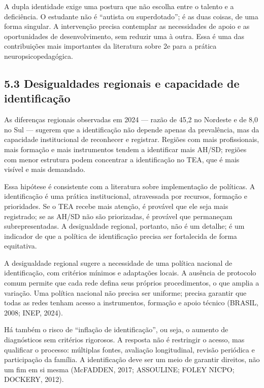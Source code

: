 A dupla identidade exige uma postura que não escolha entre o talento e a
deficiência. O estudante não é ``autista ou superdotado''; é as duas
coisas, de uma forma singular. A intervenção precisa contemplar as
necessidades de apoio e as oportunidades de desenvolvimento, sem reduzir
uma à outra. Essa é uma das contribuições mais importantes da literatura
sobre 2e para a prática neuropsicopedagógica.

\subsection{5.3 Desigualdades regionais e capacidade de
identificação}\label{desigualdades-regionais-e-capacidade-de-identificauxe7uxe3o}

As diferenças regionais observadas em 2024 --- razão de 45,2 no Nordeste
e de 8,0 no Sul --- sugerem que a identificação não depende apenas da
prevalência, mas da capacidade institucional de reconhecer e registrar.
Regiões com mais profissionais, mais formação e mais instrumentos tendem
a identificar mais AH/SD; regiões com menor estrutura podem concentrar a
identificação no TEA, que é mais visível e mais demandado.

Essa hipótese é consistente com a literatura sobre implementação de
políticas. A identificação é uma prática institucional, atravessada por
recursos, formação e prioridades. Se o TEA recebe mais atenção, é
provável que ele seja mais registrado; se as AH/SD não são priorizadas,
é provável que permaneçam subrepresentadas. A desigualdade regional,
portanto, não é um detalhe; é um indicador de que a política de
identificação precisa ser fortalecida de forma equitativa.

A desigualdade regional sugere a necessidade de uma política nacional de
identificação, com critérios mínimos e adaptações locais. A ausência de
protocolo comum permite que cada rede defina seus próprios
procedimentos, o que amplia a variação. Uma política nacional não
precisa ser uniforme; precisa garantir que todas as redes tenham acesso
a instrumentos, formação e apoio técnico (BRASIL, 2008; INEP, 2024).

Há também o risco de ``inflação de identificação'', ou seja, o aumento
de diagnósticos sem critérios rigorosos. A resposta não é restringir o
acesso, mas qualificar o processo: múltiplas fontes, avaliação
longitudinal, revisão periódica e participação da família. A
identificação deve ser um meio de garantir direitos, não um fim em si
mesma (McFADDEN, 2017; ASSOULINE; FOLEY NICPO; DOCKERY, 2012).

